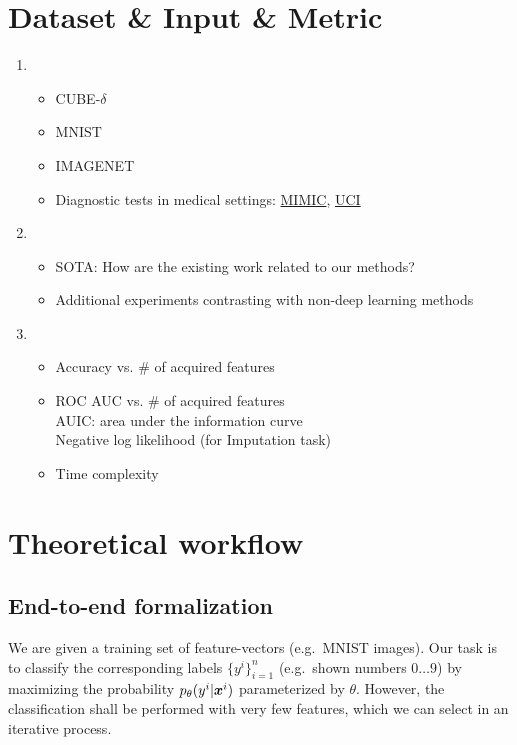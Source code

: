 \section{Dataset \& Input \& Metric}
\begin{enumerate}
\item
	\begin{itemize}
	\item
	CUBE-$\delta$
	\item
	MNIST
	\item
	IMAGENET
	\item
	Diagnostic tests in medical settings: \href{https://mimic.mit.edu}{MIMIC}, \href{https://archive.ics.uci.edu/ml/index.php}{UCI}
	\end{itemize}

\item
	\begin{itemize}
	\item
	SOTA: How are the existing work related to our methods? 
	\item
	Additional experiments contrasting with non-deep learning methods
	\end{itemize}
\item
	\begin{itemize}
	\item
	Accuracy vs. \# of acquired features
	\item
	ROC AUC vs. \# of acquired features\\
	AUIC: area under the information curve\\
	Negative log likelihood (for Imputation task)
	\item
	Time complexity
	\end{itemize}
\end{enumerate}

\section{Theoretical workflow}
\subsection{End-to-end formalization}
We are given a training set 
of feature-vectors (e.g.~MNIST images).
Our task is to classify the corresponding labels $\{y^i\}_{i=1}^n$
(e.g.~shown numbers $0 \ldots 9$) by maximizing 
the probability $p_\theta(y^i|\bm x^i)$ parameterized by $\theta$.
However, the classification shall be performed with very few features,
which we can select in an iterative process.


